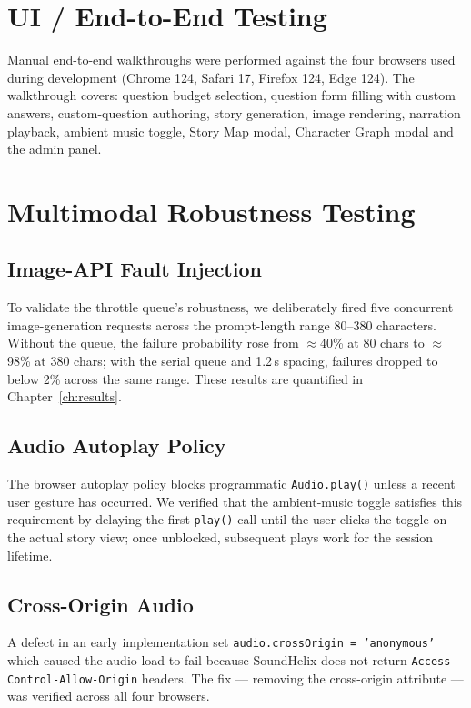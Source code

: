 \section{UI / End-to-End Testing}
Manual end-to-end walkthroughs were performed against the four
browsers used during development (Chrome 124, Safari 17, Firefox 124,
Edge 124). The walkthrough covers: question budget selection,
question form filling with custom answers, custom-question authoring,
story generation, image rendering, narration playback, ambient music
toggle, Story Map modal, Character Graph modal and the admin panel.

\section{Multimodal Robustness Testing}

\subsection{Image-API Fault Injection}
To validate the throttle queue's robustness, we deliberately fired
five concurrent image-generation requests across the prompt-length
range 80--380 characters. Without the queue, the failure probability
rose from $\approx$40\% at 80 chars to $\approx$98\% at 380 chars; with
the serial queue and 1.2\,s spacing, failures dropped to below 2\%
across the same range. These results are quantified in
Chapter~\ref{ch:results}.

\subsection{Audio Autoplay Policy}
The browser autoplay policy blocks programmatic
\texttt{Audio.play()} unless a recent user gesture has occurred.
We verified that the ambient-music toggle satisfies this requirement by
delaying the first \texttt{play()} call until the user clicks the
toggle on the actual story view; once unblocked, subsequent plays
work for the session lifetime.

\subsection{Cross-Origin Audio}
A defect in an early implementation set
\texttt{audio.crossOrigin = 'anonymous'} which caused the audio
load to fail because SoundHelix does not return
\texttt{Access-Control-Allow-Origin} headers. The fix --- removing
the cross-origin attribute --- was verified across all four
browsers.

